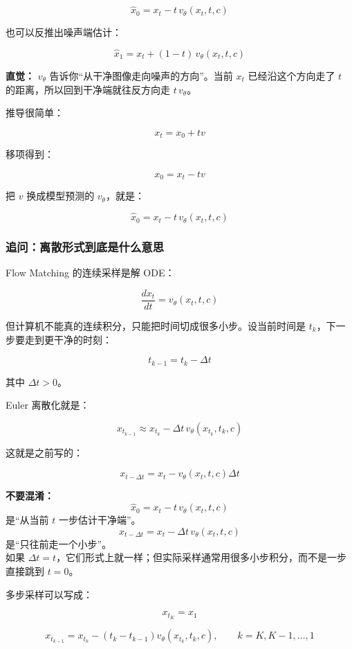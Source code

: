 \[
\hat{x}_0
=
x_t - t\,v_\theta(x_t,t,c)
\]

也可以反推出噪声端估计：

\[
\hat{x}_1
=
x_t + (1-t)\,v_\theta(x_t,t,c)
\]

\begin{intubox}
\textbf{直觉：} $v_\theta$ 告诉你“从干净图像走向噪声的方向”。当前 $x_t$ 已经沿这个方向走了 $t$ 的距离，所以回到干净端就往反方向走 $t\,v_\theta$。
\end{intubox}

推导很简单：

\[
x_t = x_0 + t v
\]

移项得到：

\[
x_0 = x_t - tv
\]

把 $v$ 换成模型预测的 $v_\theta$，就是：

\[
\hat{x}_0 = x_t - t\,v_\theta(x_t,t,c)
\]

\subsubsection{追问：离散形式到底是什么意思}

Flow Matching 的连续采样是解 ODE：

\[
\frac{dx_t}{dt}=v_\theta(x_t,t,c)
\]

但计算机不能真的连续积分，只能把时间切成很多小步。设当前时间是 $t_k$，下一步要走到更干净的时刻：

\[
t_{k-1}=t_k-\Delta t
\]

其中 $\Delta t>0$。

Euler 离散化就是：

\[
x_{t_{k-1}}
\approx
x_{t_k}
-
\Delta t\,
v_\theta(x_{t_k},t_k,c)
\]

这就是之前写的：

\[
x_{t-\Delta t}
=
x_t
-
v_\theta(x_t,t,c)\Delta t
\]

\begin{warnbox}
\textbf{不要混淆：}
\[
\hat{x}_0 = x_t - t\,v_\theta(x_t,t,c)
\]
是“从当前 $t$ 一步估计干净端”。\\
\[
x_{t-\Delta t}=x_t-\Delta t\,v_\theta(x_t,t,c)
\]
是“只往前走一个小步”。\\
如果 $\Delta t=t$，它们形式上就一样；但实际采样通常用很多小步积分，而不是一步直接跳到 $t=0$。
\end{warnbox}

多步采样可以写成：

\[
x_{t_{K}} = x_1
\]

\[
x_{t_{k-1}}
=
x_{t_k}
-
(t_k-t_{k-1})
v_\theta(x_{t_k},t_k,c),
\qquad
k=K,K-1,\ldots,1
\]

